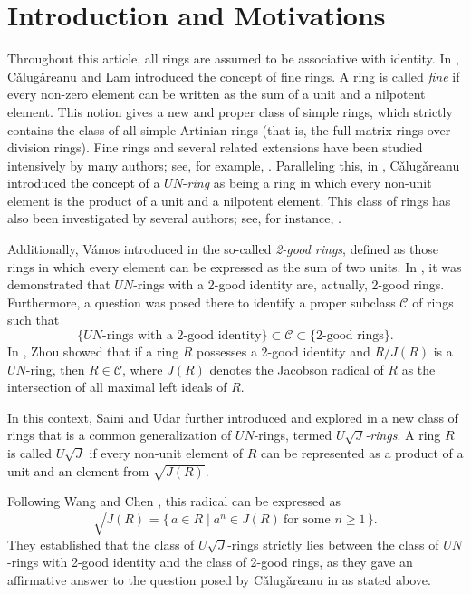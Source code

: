 \documentclass[11pt]{amsart}
\theoremstyle{definition}
\begin{document}
\section{Introduction and Motivations}

Throughout this article, all rings are assumed to be associative with identity. In \cite{cfine}, C\v{a}lug\v{a}reanu and Lam introduced the concept of fine rings. A ring is called {\it fine} if every non-zero element can be written as the sum of a unit and a nilpotent element. This notion gives a new and proper class of simple rings, which strictly contains the class of all simple Artinian rings (that is, the full matrix rings over division rings). Fine rings and several related extensions have been studied intensively by many authors; see, for example, \cite{czuun, cziun, nzmax, zgen}. Paralleling this, in \cite{cun}, C\v{a}lug\v{a}reanu introduced the concept of a $UN$-{\it ring} as being a ring in which every non-unit element is the product of a unit and a nilpotent element. This class of rings has also been investigated by several authors; see, for instance, \cite{vun, zun}.

Additionally, V\'{a}mos introduced in \cite{v2g} the so-called {\it 2-good rings}, defined as those rings in which every element can be expressed as the sum of two units. In \cite{cun}, it was demonstrated that $UN$-rings with a 2-good identity are, actually, 2-good rings. Furthermore, a question was posed there to identify a proper subclass $\mathcal{C}$ of rings such that
\[
\{\text{$UN$-rings with a 2-good identity}\} \subset \mathcal{C} \subset \{\text{2-good rings}\}.
\]
In \cite[Example~1]{zun}, Zhou showed that if a ring $R$ possesses a 2-good identity and $R/J(R)$ is a $UN$-ring, then $R \in \mathcal{C}$, where $J(R)$ denotes the Jacobson radical of $R$ as the intersection of all maximal left ideals of $R$.

In this context, Saini and Udar further introduced and explored in \cite{sd} a new class of rings that is a common generalization of $UN$-rings, termed {\it $U\sqrt{J}$-rings}. A ring $R$ is called $U\sqrt{J}$ if every non-unit element of $R$ can be represented as a product of a unit and an element from $\sqrt{J(R)}$.

Following Wang and Chen \cite{wc}, this radical can be expressed as
\[
\sqrt{J(R)}=\{\, a\in R \mid a^n \in J(R)\ \text{for some } n \ge 1 \,\}.
\]
They established that the class of $U\sqrt{J}$-rings strictly lies between the class of $UN$-rings with 2-good identity and the class of 2-good rings, as they gave an affirmative answer to the question posed by C\v{a}lug\v{a}reanu in \cite{cun} as stated above.
\end{document}
